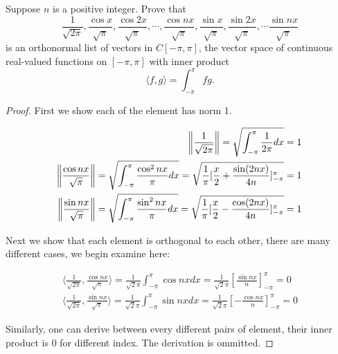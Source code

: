 \documentclass{extarticle}
\begin{document}
\begin{problem}{4}
    Suppose \(n\) is a positive integer. Prove that 
    \[\frac{1}{\sqrt{2\pi}}, \frac{\cos x}{\sqrt{\pi}}, \frac{\cos 2x}{\sqrt{\pi}}, 
    \cdots, \frac{\cos n x}{\sqrt{\pi}}, \frac{\sin x}{\sqrt{\pi}}, \frac{\sin 2x}{\sqrt{\pi}}, \cdots 
    \frac{\sin n x}{\sqrt{\pi}}\]
    is an orthonormal list of vectors in \(C[-\pi, \pi]\), the vector space of continuous real-valued functions on 
    \([-\pi, \pi]\) with inner product 
    \[\langle f,g \rangle = \int_{-\pi}^{\pi} fg.\]
\end{problem}


\begin{proof}
First we show each of the element has norm 1. 

\begin{align*}    
    \norm{\frac{1}{\sqrt{2\pi}}} 
    = \sqrt{ \int_{-\pi }^{\pi} \frac{1}{2 \pi} dx } = 1 \\ 
    \norm{\frac{\cos nx}{\sqrt{\pi}}} 
    = \sqrt{\int_{-\pi }^{\pi} \frac{\cos^2 nx}{\pi} dx} 
    = \sqrt{\frac{1}{\pi} [  \frac{x}{2} + \frac{\sin (2nx)}{4n}  ]_{-\pi}^\pi} 
    =  1 \\ 
    \norm{\frac{\sin nx}{\sqrt{\pi}}} 
    = \sqrt{\int_{-\pi }^{\pi} \frac{\sin^2 nx}{\pi} dx} = 
    \sqrt{ \frac{1}{\pi} [  \frac{x}{2} - \frac{\cos (2nx)}{4n}  ]_{-\pi}^\pi  } = 1
\end{align*}

Next we show that each element is orthogonal to each other, there are many different cases, we begin 
examine here: 

\begin{align*}
    \langle \frac{1}{\sqrt{2\pi}}, \frac{\cos nx}{\sqrt{\pi}} \rangle 
    =  \frac{1}{\sqrt{2}\pi} \int_{-\pi}^{\pi} \cos nx dx = \frac{1}{\sqrt{2}\pi} [\frac{\sin nx}{n}]_{-\pi}^\pi 
    =  0 \\ 
    \langle \frac{1}{\sqrt{2\pi}}, \frac{\sin nx}{\sqrt{\pi}} \rangle 
    = \frac{1}{\sqrt{2} \pi} \int_{-\pi }^{\pi} \sin nx dx = \frac{1}{\sqrt{2}\pi} [-\frac{\cos nx}{n}]_{-\pi}^\pi 
    = 0
\end{align*}

Similarly, one can derive between every different pairs of element, their inner product is 0 for different 
index. The derivation is ommitted.


\end{proof}
\end{document}
